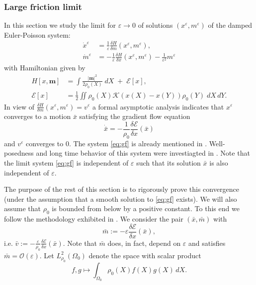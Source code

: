 \documentclass[10pt, letterpaper]{article}
\def\E{{\mathcal{E}}}
\def\bx{\bar{x}}
\def\eps{\varepsilon}
\theoremstyle{definition}
\theoremstyle{remark}
\begin{document}
\subsubsection{Large friction limit}
In this section we study the limit for $\eps \rightarrow 0$ of solutions $(x^\eps,m^\eps)$ of the damped Euler-Poisson system:
\begin{equation}\label{eq:hamsca}
 \begin{split}
  \dot{x}^\eps &= \frac{1}{\eps} \frac{\delta H}{\delta m}(x^\eps,m^\eps), \\
  {\dot{ m}}^\eps &= -\frac{1}{\eps}\frac{\delta H}{\delta x}(x^\eps,m^\eps) - \frac{1}{\eps^2} m^\eps
 \end{split}
\end{equation}
with Hamiltonian given by 
\begin{equation}
\begin{split}
 H[x, \mathbf{m}] &=  \int \frac{| \mathbf{m} |^2}{2\rho_0(X)} \; dX  \;+\; \E[x],\\
\E[x]&= \frac{1}{2} \iint \rho_0(X)\mathcal{K}(x(X) - x(Y)) \rho_0(Y) \; dX\,dY.
 \end{split}
\end{equation}
In view of $\frac{\delta H}{\delta m}(x^\eps,m^\eps)=v^\eps$ a formal asymptotic analysis indicates that $x^\eps$ converges to
a motion $\bx$ satisfying the gradient flow equation
\begin{equation}\label{eq:gf}
 \dot {\bar x} = -\frac{1}{\rho_0}\frac{\delta \E}{\delta x}(\bar x)
\end{equation}
and $v^\eps$ converges to $0$.
The system \eqref{eq:gf} is already mentioned in \cite[Rem. 4.3]{CCZ}. Well-posedness and long time behavior of this system were investiagted in \cite{BLL12}.\footnotemark[1]
Note that the limit system \eqref{eq:gf} is independent of $\eps$ such that its solution $\bx$ is also independent of $\eps.$

The purpose of the rest of this section is to rigorously prove this convergence (under the assumption that a smooth solution to \eqref{eq:gf} exists).
We will also assume that $\rho_0$ is bounded from below by a positive constant.
To this end we follow the methodology exhibited in \cite{LTforth}.
We consider the pair $(\bar x, \bar m)$ with 
\begin{equation}
 \bar m:= - \eps  \frac{\delta \E}{\delta x}(\bar x),
\end{equation}
 i.e. $\bar v:= - \frac{\eps}{\rho_0}  \frac{\delta \E}{\delta x}(\bar x).$
Note that $\bar m$ does, in fact, depend on $\eps$ and satisfies $\bar m = \mathcal{O}(\eps).$
Let $L^2_{\rho_0}(\Omega_0)$ denote the space with scalar product
\[ f,g \mapsto \int_{\Omega_0} \rho_0(X) f(X) g(X) \, dX.\]
\end{document}
